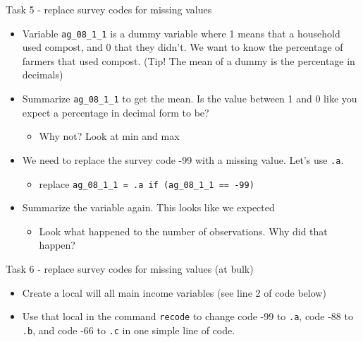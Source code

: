 \documentclass[aspectratio=169]{beamer}
\newcommand{\codeexample}[2]{
	\begin{figure}
		\VerbatimInput[
		framesep=3mm,
		frame=lines, %
		numbers=left, %
		label= #1, %
		baselinestretch=0.90, %
		]{#2} %
	\end{figure}
	\FloatBarrier
}
\begin{document}
\begin{frame}{Task 5 - replace survey codes for missing values}
	\begin{itemize}
		\item Variable \texttt{ag\_08\_1\_1} is a dummy variable where 1 means that a household used compost, and 0 that they didn’t. We want to know the percentage of farmers that used compost. (Tip! The mean of a dummy is the percentage in decimals)
		\item Summarize \texttt{ag\_08\_1\_1} to get the mean. Is the value between 1 and 0 like you expect a percentage in decimal form to be?
			\begin{itemize}
				\item Why not? Look at min and max
			\end{itemize}
		\item We need to replace the survey code -99 with a missing value. Let’s use \texttt{.a}.
			\begin{itemize}
				\item replace \texttt{ag\_08\_1\_1 = .a if (ag\_08\_1\_1 == -99)}
			\end{itemize}
		\item Summarize the variable again. This looks like we expected
			\begin{itemize}
				\item Look what happened to the number of observations. Why did that happen?
			\end{itemize}
	\end{itemize}
\end{frame}

\begin{frame}{Task 6 - replace survey codes for missing values (at bulk)}
	\begin{itemize}
		\item Create a local will all main income variables (see line 2 of code below)
		\item Use that local in the command \texttt{recode} to change code -99 to \texttt{.a}, code -88 to \texttt{.b}, and code -66 to \texttt{.c} in one simple line of code.
	\end{itemize}

	\codeexample{encode.do}{code/recode.do}
\end{frame}
\end{document}
